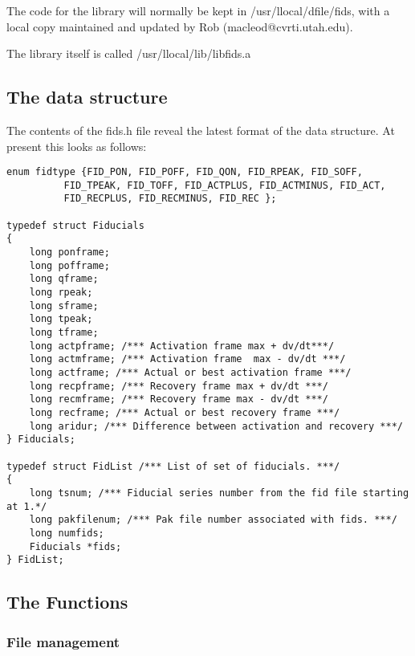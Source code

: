 \documentclass[11pt]{article}
\begin{document}
The code for the library will normally be kept in /usr/llocal/dfile/fids,
with a local copy maintained and updated by Rob (macleod@cvrti.utah.edu).

The library itself is called /usr/llocal/lib/libfids.a


\subsection{The data structure}

The contents of the fids.h file reveal the latest format of the data
structure. At present this looks as follows: 

\begin{verbatim}
enum fidtype {FID_PON, FID_POFF, FID_QON, FID_RPEAK, FID_SOFF,
	      FID_TPEAK, FID_TOFF, FID_ACTPLUS, FID_ACTMINUS, FID_ACT, 
	      FID_RECPLUS, FID_RECMINUS, FID_REC };

typedef struct Fiducials
{
    long ponframe;
    long pofframe;
    long qframe;
    long rpeak;
    long sframe;
    long tpeak;
    long tframe;
    long actpframe; /*** Activation frame max + dv/dt***/
    long actmframe; /*** Activation frame  max - dv/dt ***/
    long actframe; /*** Actual or best activation frame ***/
    long recpframe; /*** Recovery frame max + dv/dt ***/
    long recmframe; /*** Recovery frame max - dv/dt ***/
    long recframe; /*** Actual or best recovery frame ***/
    long aridur; /*** Difference between activation and recovery ***/
} Fiducials;

typedef struct FidList /*** List of set of fiducials. ***/
{
    long tsnum;	/*** Fiducial series number from the fid file starting at 1.*/
    long pakfilenum; /*** Pak file number associated with fids. ***/
    long numfids;
    Fiducials *fids;
} FidList;
\end{verbatim}

\subsection{The Functions}

\subsubsection{File management}
\end{document}
